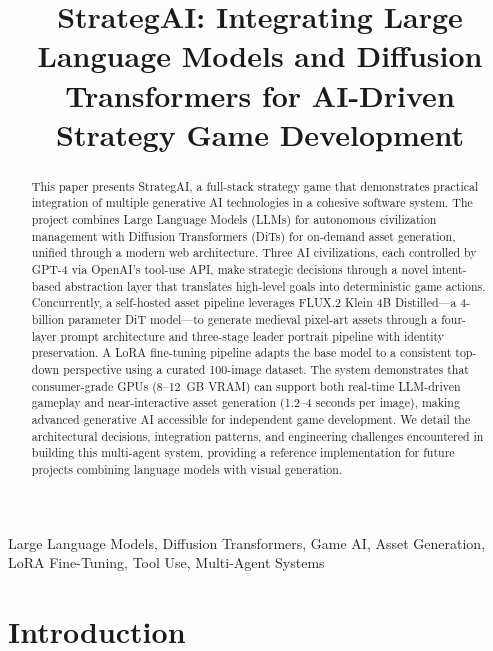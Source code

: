 \documentclass[conference]{IEEEtran}
\begin{document}
\title{StrategAI: Integrating Large Language Models and Diffusion Transformers for AI-Driven Strategy Game Development}

\author{
}

\maketitle

\begin{abstract}
This paper presents StrategAI, a full-stack strategy game that demonstrates practical integration of multiple generative AI technologies in a cohesive software system. The project combines Large Language Models (LLMs) for autonomous civilization management with Diffusion Transformers (DiTs) for on-demand asset generation, unified through a modern web architecture. Three AI civilizations, each controlled by GPT-4 via OpenAI's tool-use API, make strategic decisions through a novel intent-based abstraction layer that translates high-level goals into deterministic game actions. Concurrently, a self-hosted asset pipeline leverages FLUX.2 Klein 4B Distilled---a 4-billion parameter DiT model---to generate medieval pixel-art assets through a four-layer prompt architecture and three-stage leader portrait pipeline with identity preservation. A LoRA fine-tuning pipeline adapts the base model to a consistent top-down perspective using a curated 100-image dataset. The system demonstrates that consumer-grade GPUs (8--12~GB VRAM) can support both real-time LLM-driven gameplay and near-interactive asset generation (1.2--4 seconds per image), making advanced generative AI accessible for independent game development. We detail the architectural decisions, integration patterns, and engineering challenges encountered in building this multi-agent system, providing a reference implementation for future projects combining language models with visual generation.
\end{abstract}

\begin{IEEEkeywords}
Large Language Models, Diffusion Transformers, Game AI, Asset Generation, LoRA Fine-Tuning, Tool Use, Multi-Agent Systems
\end{IEEEkeywords}

\section{Introduction}
\end{document}
